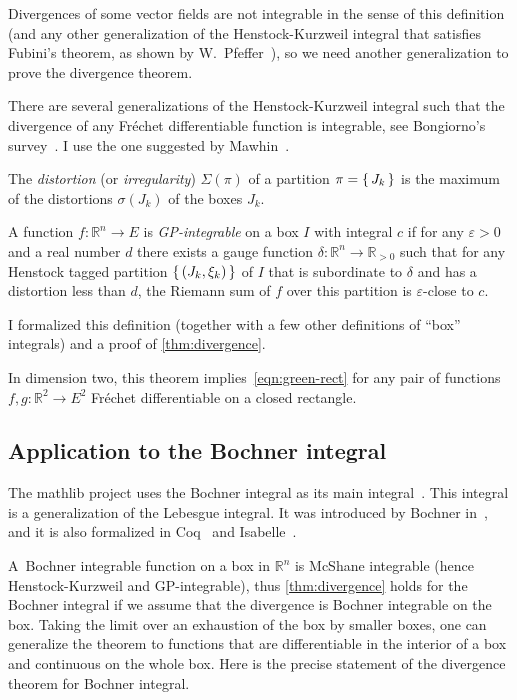 \documentclass[a4paper, UKenglish,cleveref, autoref, thm-restate]{lipics-v2021}
\newcommand{\bbR}{\mathbb{R}}
\newcommand{\eps}{\varepsilon}
\begin{document}
Divergences of some vector fields are not integrable in the sense of
this definition (and any other generalization of the Henstock-Kurzweil
integral that satisfies Fubini's theorem, as shown by
W.~Pfeffer~\cite{Pfeffer93}), so we need another generalization to
prove the divergence theorem.

There are several generalizations of the Henstock-Kurzweil integral
such that the divergence of any Fréchet differentiable function is
integrable, see Bongiorno's survey~\cite{BONGIORNO2002587}.  I use the
one suggested by Mawhin~\cite{Mawhin81}.

\begin{definition}%
  \label{def:GP-integral}
  The \emph{distortion} (or \emph{irregularity}) \(\Sigma(\pi)\) of a
  partition \(\pi=\set{J_{k}}\) is the maximum of the distortions
  \(\sigma(J_{k})\) of the boxes \(J_{k}\).

  A function \(f\colon \bbR^{n}\to E\) is \emph{GP-integrable} on a
  box \(I\) with integral \(c\) if for any \(\eps>0\) and a real
  number \(d\) there exists a gauge function
  \(\delta\colon \bbR^{n}\to \bbR_{>0}\) such that for any Henstock
  tagged partition \(\set{(J_{k}, \xi_{k})}\) of \(I\) that is
  subordinate to \(\delta\) and has a distortion less than \(d\), the
  Riemann sum of \(f\) over this partition is \(\eps\)-close to \(c\).
\end{definition}

I formalized this definition (together with a few other definitions of
“box” integrals) and a proof of \autoref{thm:divergence}.

In dimension two, this theorem implies~\eqref{eqn:green-rect} for any
pair of functions \(f, g \colon \bbR^{2}\to E^{2}\) Fréchet
differentiable on a closed rectangle.

\subsection{Application to the Bochner integral}\label{ssec:Bochner}

The mathlib project uses the Bochner integral as its main
integral~\cite{vandoorn:LIPIcs.ITP.2021.18}. This integral is a
generalization of the Lebesgue integral. It was introduced by Bochner
in~\cite{Bochner1933IntegrationVF}, and it is also formalized in
Coq~\cite{boldo2022coq} and Isabelle~\cite{Avigad17}.

A~Bochner integrable function on a box in \(\bbR^{n}\) is McShane
integrable (hence Henstock-Kurzweil and GP-integrable), thus
\autoref{thm:divergence} holds for the Bochner integral if we assume
that the divergence is Bochner integrable on the box. Taking the limit
over an exhaustion of the box by smaller boxes, one can generalize the
theorem to functions that are differentiable in the interior of a box
and continuous on the whole box. Here is the precise statement of the
divergence theorem for Bochner integral.
\end{document}
